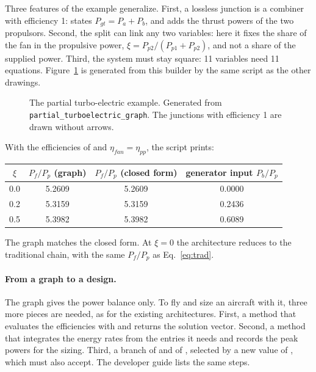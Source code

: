 \documentclass[a4paper,11pt]{article}
\begin{document}


Three features of the example generalize. First, a lossless junction is a combiner with
efficiency 1:  states $P_{gt} = P_a + P_b$, and
 adds the thrust powers of the two propulsors.
Second, the split can link any two variables: here it fixes the share of the fan in the
propulsive power, $\xi = P_{p2}/(P_{p1} + P_{p2})$, and not a share of the supplied power.
Third, the system must stay square: 11 variables need 11 equations. Figure~\ref{fig:g-new} is
generated from this builder by the same script as the other drawings.

\begin{figure}[htbp]
\centering

\caption{The partial turbo-electric example. Generated from
\texttt{partial\_turboelectric\_graph}. The junctions with efficiency 1 are drawn without
arrows.}\label{fig:g-new}
\end{figure}

With the efficiencies of  and $\eta_{fan} = \eta_{pp}$, the script prints:
\begin{center}\small
\begin{tabular}{@{}cccc@{}}
\toprule
$\xi$ & $P_f/P_p$ (graph) & $P_f/P_p$ (closed form) & generator input $P_b/P_p$ \\
\midrule
0.0 & 5.2609 & 5.2609 & 0.0000 \\
0.2 & 5.3159 & 5.3159 & 0.2436 \\
0.5 & 5.3982 & 5.3982 & 0.6089 \\
\bottomrule
\end{tabular}
\end{center}
The graph matches the closed form. At $\xi = 0$ the architecture reduces to the traditional
chain, with the same $P_f/P_p$ as Eq.~\eqref{eq:trad}.

\paragraph{From a graph to a design.} The graph gives the power balance only. To fly and size
an aircraft with it, three more pieces are needed, as for the existing architectures. First,
a  method that evaluates the efficiencies with  and returns
the solution vector. Second, a  method that integrates the
energy rates from the entries it needs and records the peak powers for the sizing. Third, a
branch of  and of , selected by a new
value of , which  must also accept.
The developer guide  lists the same steps.
\end{document}
